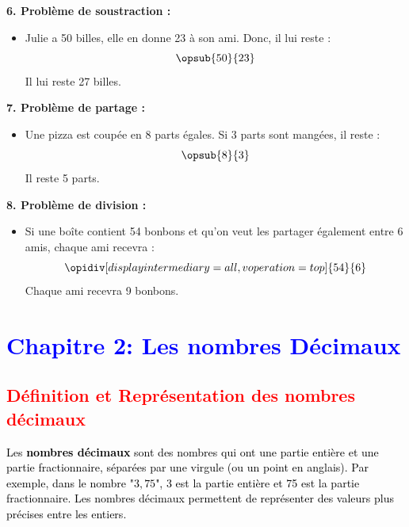 \documentclass{article}
\begin{document}
\begin{tcolorbox}[colback=green!10!white, colframe=green!75!black, sharp corners=south, boxrule=0.8mm, title=Corrections]

    \textbf{6. Problème de soustraction :}
    \begin{itemize}
        \item Julie a 50 billes, elle en donne 23 à son ami. Donc, il lui reste :
        \[
        \opsub{50}{23} 
        \]
        Il lui reste 27 billes.
    \end{itemize}

    \textbf{7. Problème de partage :}
    \begin{itemize}
        \item Une pizza est coupée en 8 parts égales. Si 3 parts sont mangées, il reste :
        \[
        \opsub{8}{3} 
        \]
        Il reste 5 parts.
    \end{itemize}

    \textbf{8. Problème de division :}
    \begin{itemize}
        \item Si une boîte contient 54 bonbons et qu’on veut les partager également entre 6 amis, chaque ami recevra :
        \[
        \opidiv[displayintermediary=all,voperation=top]{54}{6} 
        \]
        Chaque ami recevra 9 bonbons.
    \end{itemize}
\end{tcolorbox}

\newpage

\section{\textcolor{blue}{Chapitre 2: Les nombres Décimaux}}

\subsection{\textcolor{red}{Définition et Représentation des nombres décimaux}}

\vspace{0.2cm}

\begin{tcolorbox}[colback=cyan!10!white, colframe=red!75!black, title=\textcolor{white}{Définition}, 
                  sharp corners=southwest]

\textcolor{black}{Les \textbf{nombres décimaux} sont des nombres qui ont une partie entière et une partie fractionnaire, séparées par une virgule (ou un point en anglais). Par exemple, dans le nombre "$3,75$", 3 est la partie entière et 75 est la partie fractionnaire. Les nombres décimaux permettent de représenter des valeurs plus précises entre les entiers.}

\end{tcolorbox}
\end{document}
